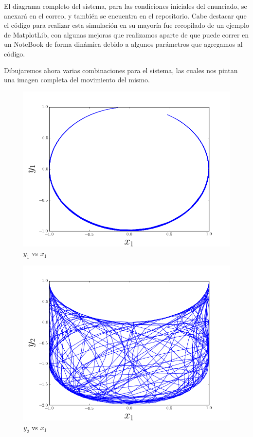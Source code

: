 \documentclass[a4paper,10pt]{article}
\numberwithin{equation}{section}
\begin{document}
\vspace{.3cm}

El diagrama completo del sistema, para las condiciones iniciales
del enunciado, se anexará en el correo, y también se encuentra en el 
repositorio. Cabe destacar que el código para realizar esta simulación en su mayoría 
fue recopilado de un ejemplo de MatplotLib, con algunas mejoras que realizamos aparte 
de que puede correr en un NoteBook de forma dinámica debido a algunos parámetros
que agregamos al código.

\vspace{.3cm}

Dibujaremos ahora varias combinaciones para el sistema, las cuales nos pintan 
una imagen completa del movimiento del mismo.

\begin{figure}[H]
\center
\includegraphics[scale=0.5]{problema2fig2}
\caption{$y_1$ vs $x_1$}
\label{fig:problema2fig2}
\end{figure}

\begin{figure}[H]
\center
\includegraphics[scale=0.5]{problema2fig3}
\caption{$y_2$ vs $x_1$}
\label{fig:problema2fig3}
\end{figure}
\end{document}
